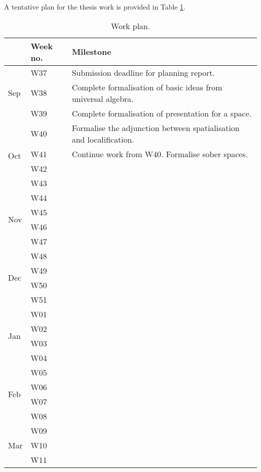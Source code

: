 \documentclass{article}
\begin{document}
A tentative plan for the thesis work is provided in Table \ref{table:plan}.

\begin{table}[]\caption{Work plan.}\label{table:plan}
\begin{tabular}{lll}
&      Week no. & Milestone                                                                  \\\hline
\multirow{3}{*}{Sep} & W37  & Submission deadline for planning report. \\
                     & W38  & Complete formalisation of basic ideas from universal algebra. \\
                     & W39  & Complete formalisation of presentation for a space. \\ \hline
\multirow{4}{*}{Oct} & W40  & Formalise the adjunction between spatialisation and localification. \\
                     & W41  & Continue work from W40. Formalise sober spaces. \\
                     & W42  & \\
                     & W43  & \\ \hline
\multirow{4}{*}{Nov} & W44  & \\
                     & W45  & \\
                     & W46  & \\
                     & W47  & \\ \hline
\multirow{4}{*}{Dec} & W48  & \\
                     & W49  & \\
                     & W50  & \\
                     & W51  & \\ \hline
\multirow{4}{*}{Jan} & W01  & \\
                     & W02  & \\
                     & W03  & \\
                     & W04  & \\ \hline
\multirow{4}{*}{Feb} & W05  & \\
                     & W06  & \\
                     & W07  & \\
                     & W08  & \\ \hline
\multirow{4}{*}{Mar} & W09  & \\
                     & W10  & \\
                     & W11  & \\

\end{tabular}
\end{table}
\end{document}
